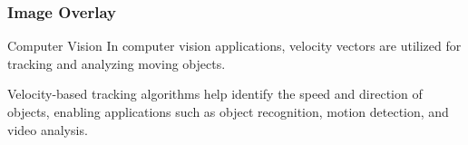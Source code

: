 \documentclass{beamer}
\begin{document}
\begin{frame}[plain]
        \frametitle{Image Overlay}
    
\end{frame}

\begin{frame}[t]{Computer Vision}
\vspace{15pt}
In computer vision applications, velocity vectors are utilized for tracking and analyzing moving objects.

Velocity-based tracking algorithms help identify the speed and direction of objects, enabling applications such as object recognition, motion detection, and video analysis.
\end{frame}
\end{document}
